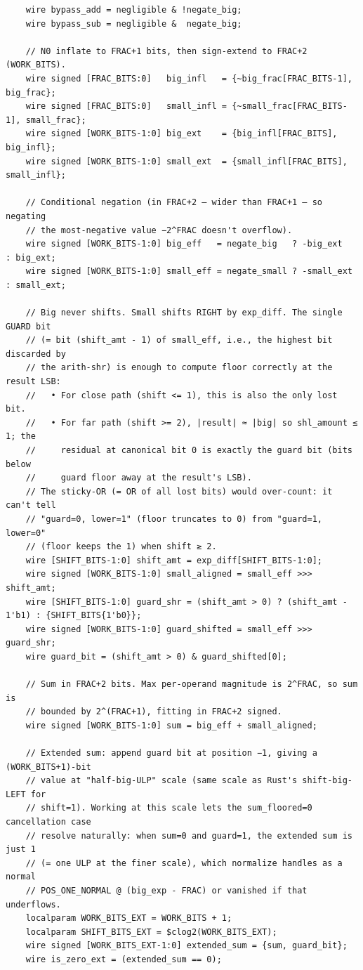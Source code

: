 \documentclass[12pt,letter]{article}
\begin{document}
\begin{lstlisting}
    wire bypass_add = negligible & !negate_big;
    wire bypass_sub = negligible &  negate_big;

    // N0 inflate to FRAC+1 bits, then sign-extend to FRAC+2 (WORK_BITS).
    wire signed [FRAC_BITS:0]   big_infl   = {~big_frac[FRAC_BITS-1],   big_frac};
    wire signed [FRAC_BITS:0]   small_infl = {~small_frac[FRAC_BITS-1], small_frac};
    wire signed [WORK_BITS-1:0] big_ext    = {big_infl[FRAC_BITS],   big_infl};
    wire signed [WORK_BITS-1:0] small_ext  = {small_infl[FRAC_BITS], small_infl};

    // Conditional negation (in FRAC+2 — wider than FRAC+1 — so negating
    // the most-negative value −2^FRAC doesn't overflow).
    wire signed [WORK_BITS-1:0] big_eff   = negate_big   ? -big_ext   : big_ext;
    wire signed [WORK_BITS-1:0] small_eff = negate_small ? -small_ext : small_ext;

    // Big never shifts. Small shifts RIGHT by exp_diff. The single GUARD bit
    // (= bit (shift_amt - 1) of small_eff, i.e., the highest bit discarded by
    // the arith-shr) is enough to compute floor correctly at the result LSB:
    //   • For close path (shift <= 1), this is also the only lost bit.
    //   • For far path (shift >= 2), |result| ≈ |big| so shl_amount ≤ 1; the
    //     residual at canonical bit 0 is exactly the guard bit (bits below
    //     guard floor away at the result's LSB).
    // The sticky-OR (= OR of all lost bits) would over-count: it can't tell
    // "guard=0, lower=1" (floor truncates to 0) from "guard=1, lower=0"
    // (floor keeps the 1) when shift ≥ 2.
    wire [SHIFT_BITS-1:0] shift_amt = exp_diff[SHIFT_BITS-1:0];
    wire signed [WORK_BITS-1:0] small_aligned = small_eff >>> shift_amt;
    wire [SHIFT_BITS-1:0] guard_shr = (shift_amt > 0) ? (shift_amt - 1'b1) : {SHIFT_BITS{1'b0}};
    wire signed [WORK_BITS-1:0] guard_shifted = small_eff >>> guard_shr;
    wire guard_bit = (shift_amt > 0) & guard_shifted[0];

    // Sum in FRAC+2 bits. Max per-operand magnitude is 2^FRAC, so sum is
    // bounded by 2^(FRAC+1), fitting in FRAC+2 signed.
    wire signed [WORK_BITS-1:0] sum = big_eff + small_aligned;

    // Extended sum: append guard bit at position −1, giving a (WORK_BITS+1)-bit
    // value at "half-big-ULP" scale (same scale as Rust's shift-big-LEFT for
    // shift=1). Working at this scale lets the sum_floored=0 cancellation case
    // resolve naturally: when sum=0 and guard=1, the extended sum is just 1
    // (= one ULP at the finer scale), which normalize handles as a normal
    // POS_ONE_NORMAL @ (big_exp - FRAC) or vanished if that underflows.
    localparam WORK_BITS_EXT = WORK_BITS + 1;
    localparam SHIFT_BITS_EXT = $clog2(WORK_BITS_EXT);
    wire signed [WORK_BITS_EXT-1:0] extended_sum = {sum, guard_bit};
    wire is_zero_ext = (extended_sum == 0);


\end{lstlisting}
\end{document}
